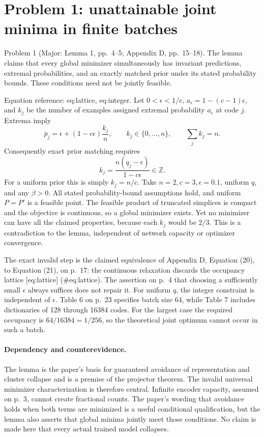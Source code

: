 \documentclass[10pt]{article}
\begin{document}
\section*{Problem 1: unattainable joint minima in finite batches}
Problem 1 (Major: Lemma 1, pp. 4–5; Appendix D, pp. 15–18).  The lemma claims that every global minimizer simultaneously has invariant predictions, extremal probabilities, and an exactly matched prior under its stated probability bounds. These conditions need not be jointly feasible.\par
Equation reference: eq:lattice, eq:integer. Let \(0<\epsilon<1/c\), \(a_\epsilon=1-(c-1)\epsilon\), and \(k_j\) be the number of examples assigned extremal probability \(a_\epsilon\) at code \(j\). Extrema imply \[\bar p_j=\epsilon+(1-c\epsilon)\frac{k_j}{n},\qquad
 k_j\in\{0,\ldots,n\},\qquad \sum_j k_j=n.
 \] Consequently exact prior matching requires \[k_j=\frac{n(q_j-\epsilon)}{1-c\epsilon}\in\mathbb Z.
 \] For a uniform prior this is simply \(k_j=n/c\). Take \(n=2,c=3,\epsilon=0.1\), uniform \(q\), and any \(\beta>0\). All stated probability-bound assumptions hold, and uniform \(P=P'\) is a feasible point. The feasible product of truncated simplices is compact and the objective is continuous, so a global minimizer exists. Yet no minimizer can have all the claimed properties, because each \(k_j\) would be \(2/3\). This is a contradiction to the lemma, independent of network capacity or optimizer convergence.\par
The exact invalid step is the claimed equivalence of Appendix D, Equation (20), to Equation (21), on p. 17: the continuous relaxation discards the occupancy lattice [eq:lattice] (\#eq:lattice). The assertion on p. 4 that choosing a sufficiently small \(\epsilon\) always suffices does not repair it. For uniform \(q\), the integer constraint is independent of \(\epsilon\). Table 6 on p. 23 specifies batch size 64, while Table 7 includes dictionaries of 128 through 16384 codes. For the largest case the required occupancy is \(64/16384=1/256\), so the theoretical joint optimum cannot occur in such a batch.\par
\paragraph*{Dependency and counterevidence.}\mbox{}\par
The lemma is the paper’s basis for guaranteed avoidance of representation and cluster collapse and is a premise of the projector theorem. The invalid universal minimizer characterization is therefore central. Infinite encoder capacity, assumed on p. 3, cannot create fractional counts. The paper’s wording that avoidance holds when both terms are minimized is a useful conditional qualification, but the lemma also asserts that global minima jointly meet those conditions. No claim is made here that every actual trained model collapses.\par
\end{document}
